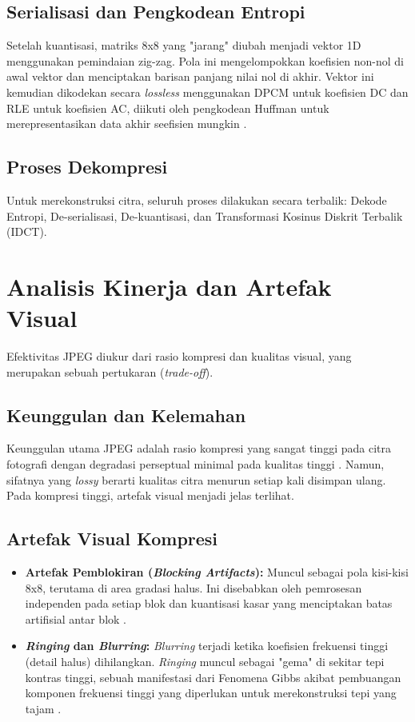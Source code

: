 \documentclass[a4paper]{article}
\begin{document}
\subsection{Serialisasi dan Pengkodean Entropi}
Setelah kuantisasi, matriks 8x8 yang "jarang" diubah menjadi vektor 1D menggunakan pemindaian zig-zag. Pola ini mengelompokkan koefisien non-nol di awal vektor dan menciptakan barisan panjang nilai nol di akhir. Vektor ini kemudian dikodekan secara \textit{lossless} menggunakan DPCM untuk koefisien DC dan RLE untuk koefisien AC, diikuti oleh pengkodean Huffman untuk merepresentasikan data akhir seefisien mungkin \cite{wallace1991jpeg}.

\subsection{Proses Dekompresi}
Untuk merekonstruksi citra, seluruh proses dilakukan secara terbalik: Dekode Entropi, De-serialisasi, De-kuantisasi, dan Transformasi Kosinus Diskrit Terbalik (IDCT).

\section{Analisis Kinerja dan Artefak Visual}
Efektivitas JPEG diukur dari rasio kompresi dan kualitas visual, yang merupakan sebuah pertukaran (\textit{trade-off}).

\subsection{Keunggulan dan Kelemahan}
Keunggulan utama JPEG adalah rasio kompresi yang sangat tinggi pada citra fotografi dengan degradasi perseptual minimal pada kualitas tinggi \cite{wallace1991jpeg}. Namun, sifatnya yang \textit{lossy} berarti kualitas citra menurun setiap kali disimpan ulang. Pada kompresi tinggi, artefak visual menjadi jelas terlihat.

\subsection{Artefak Visual Kompresi}
\begin{itemize}
  \item \textbf{Artefak Pemblokiran (\textit{Blocking Artifacts}):} Muncul sebagai pola kisi-kisi 8x8, terutama di area gradasi halus. Ini disebabkan oleh pemrosesan independen pada setiap blok dan kuantisasi kasar yang menciptakan batas artifisial antar blok \cite{singh2012blocking, chou1998smoothing}.
  \item \textbf{\textit{Ringing} dan \textit{Blurring}:} \textit{Blurring} terjadi ketika koefisien frekuensi tinggi (detail halus) dihilangkan. \textit{Ringing} muncul sebagai "gema" di sekitar tepi kontras tinggi, sebuah manifestasi dari Fenomena Gibbs akibat pembuangan komponen frekuensi tinggi yang diperlukan untuk merekonstruksi tepi yang tajam \cite{gottlieb1996gibbs, marziliano2004perceptual}.
\end{itemize}
\end{document}
